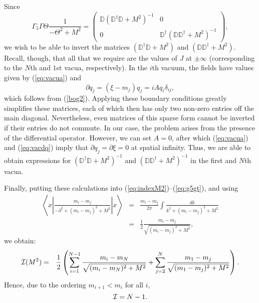 \documentclass[a4paper,preprint,preprintnumbers,amsmath,amssymb]{revtex4}
\begin{document}
Since 
\begin{equation}
   \Gamma_5 \Gamma \Theta \frac{1}{-\Theta^2 + M^2}
 =  \left(\begin{array}{cc}
     \mathbb{D} (\mathbb{D}^\dagger \mathbb{D} + M^2)^{-1} &  0 \\
    0 & \mathbb{D}^\dagger (\mathbb{D} \mathbb{D}^\dagger + M^2)^{-1} 
            \end{array}\right),
     \label{eq:g5gt}
\end{equation}
we wish to be able to invert the matrices 
$(\mathbb{D}^\dagger \mathbb{D} + M^2)$ and
$(\mathbb{D} \mathbb{D}^\dagger + M^2)$.
Recall, though, that all that we require are the values of $J$ at $\pm \infty$ 
(corresponding to the $N$th and $1$st vacua, respectively). 
In the $i$th vacuum, the fields have values given by (\ref{eq:vacua}) and
\begin{equation}
  \partial q_j = (\xi - m_j) q_j = i A q_i \delta_{ij},
     \label{eq:vacdq}
\end{equation}
which follows from (\ref{bog2}). 
Applying these boundary conditions greatly simplifies these matrices,
each of which then has only two non-zero entries off the main diagonal.
Nevertheless, even matrices of this sparse form cannot be inverted if their 
entries do not commute. In our case, the problem arises from the presence of
the differential operator. However, we can set $A = 0$, after which
(\ref{eq:vacua}) and (\ref{eq:vacdq}) imply that 
$\partial q_j = \partial \xi = 0$ at spatial infinity.
Thus, we are able to obtain expressions for
$(\mathbb{D}^\dagger \mathbb{D} + M^2)^{-1}$ and
$(\mathbb{D} \mathbb{D}^\dagger + M^2)^{-1}$ in the first and $N$th vacua.

Finally, putting these calculations 
into (\ref{eq:indexM2})--(\ref{eq:g5gt}),
and using
\begin{eqnarray}
  \left\langle x \left| 
     \frac{m_i - m_j}{-\partial^2 + (m_i - m_j)^2 + M^2}
  \right| x \right\rangle 
   & = & \frac{m_i - m_j}{2\pi} \int \frac{dk}{k^2 + (m_i - m_j)^2 + M^2}
   \nonumber \\
   & = &  \frac{1}{2} \frac{m_i - m_j}{\sqrt{(m_i - m_j)^2 + M^2}},
\end{eqnarray}
we obtain:
\begin{eqnarray}
{\cal I}(M^2) 
   & = & \frac{1}{2} \left( 
  \sum_{i=1}^{N-1} \frac{m_i - m_N}{\sqrt{(m_i - m_N)^2 + M^2}}
+ \sum_{j=2}^{N} \frac{m_1 - m_j}{\sqrt{(m_1 - m_j)^2 + M^2}}
      \right).
   \label{eq:indMres}
\end{eqnarray}
Hence, due to the ordering $m_{i+1} < m_i$ for all $i$, 
\begin{equation}
   {\cal I} = N-1.
\end{equation}
\end{document}
